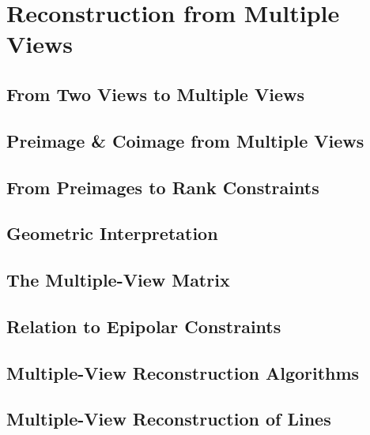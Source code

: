 \section{Reconstruction from Multiple Views}%
\label{sec:reconstruction_from_multiple_views}


\subsection{From Two Views to Multiple Views}%
\label{sub:from_two_views_to_multiple_views}


\subsection{Preimage \& Coimage from Multiple Views}%
\label{sub:preimage_coimage_from_multiple_views}


\subsection{From Preimages to Rank Constraints}%
\label{sub:from_preimages_to_rank_constraints}


\subsection{Geometric Interpretation}%
\label{sub:geometric_interpretation}


\subsection{The Multiple-View Matrix}%
\label{sub:the_multiple_view_matrix}


\subsection{Relation to Epipolar Constraints}%
\label{sub:relation_to_epipolar_constraints}


\subsection{Multiple-View Reconstruction Algorithms}%
\label{sub:multiple_view_reconstruction_algorithms}


\subsection{Multiple-View Reconstruction of Lines}%
\label{sub:multiple_view_reconstruction_of_lines}


